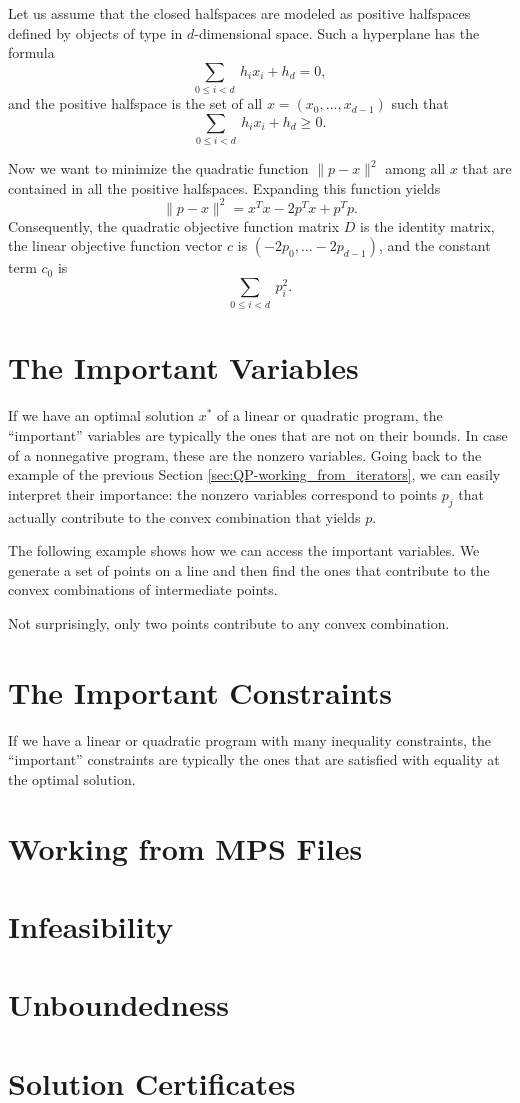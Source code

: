 Let us assume that the closed halfspaces are modeled as positive halfspaces
defined by objects of type  in $d$-dimensional
space. Such a hyperplane has the formula 
\[\sum_{0\leq i< d}~ h_{i}x_{i} + h_{d}=0,\]
and the positive halfspace is the set of all $x=(x_{0},\ldots,x_{d-1})$ 
such that 
\[\sum_{0\leq i< d}~h_{i}x_{i} + h_{d} \geq 0.\]

Now we want to minimize the quadratic function $\|p-x\|^2$ among all $x$
that are contained in all the positive halfspaces. Expanding this function
yields 
\[
\|p-x\|^2 = x^{T}x - 2p^{T}x + p^{T}p.
\]
Consequently, the quadratic objective function matrix $D$ is the identity
matrix, the linear objective function vector $c$ is 
$(-2p_{0},\ldots -2p_{d-1})$, and the constant term $c_{0}$ is
\[
\sum_{0\leq i< d}~ p_{i}^2.
\]  


\section{The Important Variables}
If we have an optimal solution $x^*$ of a linear or quadratic program,
the ``important'' variables are typically the ones that are not on
their bounds. In case of a nonnegative program, these are the nonzero
variables.  Going back to the example of the previous Section
\ref{sec:QP-working_from_iterators}, we can easily interpret their
importance: the nonzero variables correspond to points $p_j$ that
actually contribute to the convex combination that yields $p$. 

The following example shows how we can access the important variables.
We generate a set of points on a line and then find the ones that 
contribute to the convex combinations of intermediate points.


Not surprisingly, only two points contribute to any convex
combination.

\section{The Important Constraints}\label{sec:QP-important_constraints}
If we have a linear or quadratic program with many inequality constraints,
the ``important'' constraints are typically the ones that are satisfied with
equality at the optimal solution. 




\section{Working from MPS Files}

\section{Infeasibility}\label{sec:QP-infeasible}

\section{Unboundedness}\label{sec:QP-unbounded}




\section{Solution Certificates}



